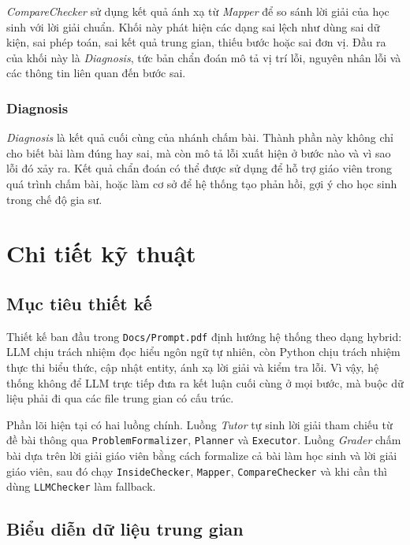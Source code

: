 \documentclass[12pt,a4paper]{article}
\begin{document}
\textit{CompareChecker} sử dụng kết quả ánh xạ từ \textit{Mapper} để so sánh lời giải của học sinh với lời giải chuẩn. Khối này phát hiện các dạng sai lệch như dùng sai dữ kiện, sai phép toán, sai kết quả trung gian, thiếu bước hoặc sai đơn vị. Đầu ra của khối này là \textit{Diagnosis}, tức bản chẩn đoán mô tả vị trí lỗi, nguyên nhân lỗi và các thông tin liên quan đến bước sai.

\subsubsection{Diagnosis}

\textit{Diagnosis} là kết quả cuối cùng của nhánh chấm bài. Thành phần này không chỉ cho biết bài làm đúng hay sai, mà còn mô tả lỗi xuất hiện ở bước nào và vì sao lỗi đó xảy ra. Kết quả chẩn đoán có thể được sử dụng để hỗ trợ giáo viên trong quá trình chấm bài, hoặc làm cơ sở để hệ thống tạo phản hồi, gợi ý cho học sinh trong chế độ gia sư.

\section{Chi tiết kỹ thuật}

\subsection{Mục tiêu thiết kế}

Thiết kế ban đầu trong \texttt{Docs/Prompt.pdf} định hướng hệ thống theo dạng
hybrid: LLM chịu trách nhiệm đọc hiểu ngôn ngữ tự nhiên, còn Python chịu trách
nhiệm thực thi biểu thức, cập nhật entity, ánh xạ lời giải và kiểm tra lỗi. Vì
vậy, hệ thống không để LLM trực tiếp đưa ra kết luận cuối cùng ở mọi bước, mà
buộc dữ liệu phải đi qua các file trung gian có cấu trúc.

Phần lõi hiện tại có hai luồng chính. Luồng \textit{Tutor} tự sinh lời giải
tham chiếu từ đề bài thông qua \texttt{ProblemFormalizer},
\texttt{Planner} và \texttt{Executor}. Luồng \textit{Grader} chấm bài dựa trên
lời giải giáo viên bằng cách formalize cả bài làm học sinh và lời giải giáo
viên, sau đó chạy \texttt{InsideChecker}, \texttt{Mapper},
\texttt{CompareChecker} và khi cần thì dùng \texttt{LLMChecker} làm fallback.

\subsection{Biểu diễn dữ liệu trung gian}
\end{document}
